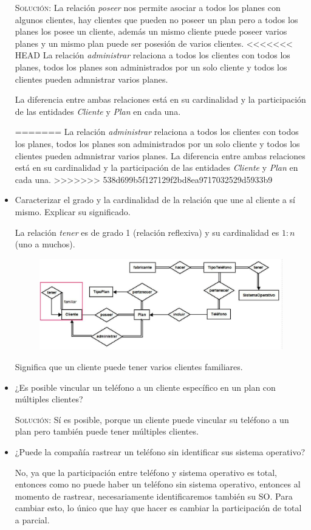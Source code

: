 \documentclass[letterpaper,11pt]{article}
\begin{document}
\begin{itemize}
    \textsc{Solución:} La relación \textit{poseer} nos permite asociar a todos los planes con algunos clientes, hay clientes que pueden no poseer un plan pero a todos los planes los posee un cliente, además un mismo cliente puede poseer varios planes y un mismo plan puede ser posesión de varios clientes.
<<<<<<< HEAD
    La relación \textit{administrar} relaciona a todos los clientes con todos los planes, todos los planes son administrados por un solo cliente y todos los clientes pueden admnistrar varios planes.

    La diferencia entre ambas relaciones está en su cardinalidad y la participación de las entidades \textit{Cliente} y \textit{Plan} en cada una.

=======
La relación \textit{administrar} relaciona a todos los clientes con todos los planes, todos los planes son administrados por un solo cliente y todos los clientes pueden admnistrar varios planes.
La diferencia entre ambas relaciones está en su cardinalidad y la participación de las entidades \textit{Cliente} y \textit{Plan} en cada una.
>>>>>>> 538d699b5f127129f2bd8ea9717032529d5933b9

    \item Caracterizar el grado y la cardinalidad de la relación que une al
    cliente a sí mismo. Explicar su significado.

    La relación \textit{tener} es de grado 1 (relación reflexiva) y su
    cardinalidad es $1:n$ (uno a muchos).

    \begin{figure}[H]
        \centering
        \includegraphics[scale=0.4]{./imagenes/modelo11.jpg}
    \end{figure}

    Significa que un cliente puede tener varios clientes familiares.
    \item ¿Es posible vincular un teléfono a un cliente específico en un plan
    con múltiples clientes?

    \textsc{Solución:}
    Sí es posible, porque un cliente puede vincular su teléfono a un plan pero también puede tener múltiples clientes.

    \item ¿Puede la compañía rastrear un teléfono sin identificar sus sistema
    operativo?

    No, ya que la participación entre teléfono y sistema operativo es total, entonces como no puede haber un teléfono sin sistema operativo, entonces al momento de rastrear, necesariamente identificaremos también su SO.
    Para cambiar esto, lo único que hay que hacer es cambiar la participación de total a parcial.

\end{itemize}
\end{document}
